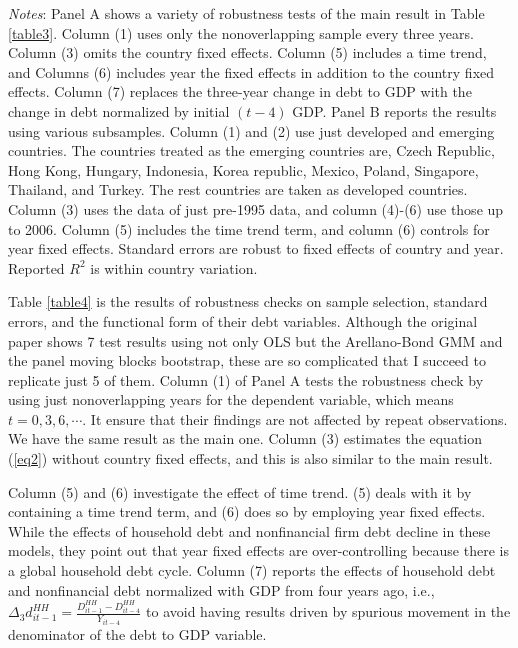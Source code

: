\documentclass{ltjarticle}
\begin{document}
\begin{table}
\begin{tablenotes}
    \item \textit{Notes}: Panel A shows a variety of robustness tests of the main result in Table \ref{table3}. Column (1) uses only the nonoverlapping sample every three years. Column (3) omits the country fixed effects. Column (5) includes a time trend, and Columns (6) includes year the fixed effects in addition to the country fixed effects. Column (7) replaces the three-year change in debt to GDP with the change in debt normalized by initial $(t-4)$ GDP. Panel B reports the results using various subsamples. Column (1) and (2) use just developed and emerging countries. The countries treated as the emerging countries are, Czech Republic, Hong Kong, Hungary, Indonesia, Korea republic, Mexico, Poland, Singapore, Thailand, and Turkey. The rest countries are taken as developed countries. Column (3) uses the data of just pre-1995 data, and column (4)-(6) use those up to 2006. Column (5) includes the time trend term, and column (6) controls for year fixed effects. Standard errors are robust to fixed effects of country and year. Reported $R^{2}$ is within country variation.
\end{tablenotes}
\end{table}

Table \ref{table4} is the results of robustness checks on sample selection, standard errors, and the functional form of their debt variables. Although the original paper shows 7 test results using not only OLS but the Arellano-Bond GMM and the panel moving blocks bootstrap, these are so complicated that I succeed to replicate just 5 of them. Column (1) of Panel A tests the robustness check by using just nonoverlapping years for the dependent variable, which means $t=0, 3, 6,\cdots$. It ensure that their findings are not affected by repeat observations. We have the same result as the main one. Column (3) estimates the equation (\ref{eq2}) without country fixed effects, and this is also similar to the main result.

Column (5) and (6) investigate the effect of time trend. (5) deals with it by containing a time trend term, and (6) does so by employing year fixed effects. While the effects of household debt and nonfinancial firm debt decline in these models, they point out that year fixed effects are over-controlling because there is a global household debt cycle. Column (7) reports the effects of household debt and nonfinancial debt normalized with GDP from four years ago, i.e., $\Delta_{3}d_{it-1}^{HH}=\frac{D_{it-1}^{HH}-D_{it-4}^{HH}}{Y_{it-4}} $ to avoid having results driven by spurious movement in the denominator of the debt to GDP variable. 
\end{document}
